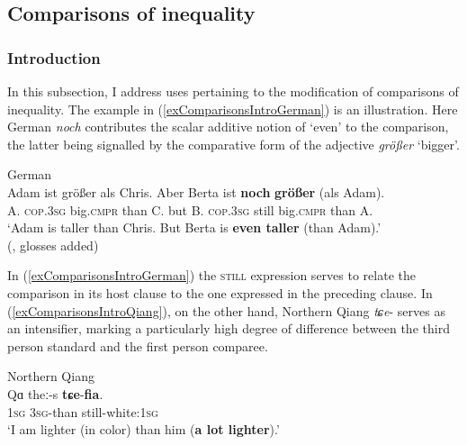 {\subsection{Comparisons of inequality}\label{sectionComparisons} 
\subsubsection{Introduction} In this subsection, I address uses pertaining to the modification of comparisons of inequality. The example in (\ref{exComparisonsIntroGerman}) is an illustration. Here German \textit{noch} contributes the scalar additive notion of \lq even\rq{ }to the comparison, the latter being signalled by the comparative form of the adjective \textit{größer} \lq bigger\rq{}.

\begin{exe}
	\ex German\label{exComparisonsIntroGerman}\\
	\gll Adam ist größer als Chris. Aber Berta ist \textbf{noch} \textbf{größer} (als Adam).\\
	A. \textsc{cop}.3\textsc{sg} big.\textsc{cmpr} than C. but B. \textsc{cop}.3\textsc{sg} still big.\textsc{cmpr} \phantom{(}than A.\\
	\glt \lq Adam is taller than Chris. But Berta is \textbf{even taller} (than Adam).\rq{}
	\\(\cite[9]{Umbach2009}, glosses added)
\end{exe}

In (\ref{exComparisonsIntroGerman}) the \textsc{still} expression serves to relate the comparison in its host clause to the one expressed in the preceding clause. In (\ref{exComparisonsIntroQiang}), on the other hand, Northern Qiang \mbox{\textit{tɕe}-} serves as an intensifier, marking a particularly high degree of difference between the third person standard and the first person comparee.

\begin{exe}
	\ex Northern Qiang\label{exComparisonsIntroQiang}\\
	\gll Qɑ theː-s \textbf{tɕe}-\textbf{fia}.\\
	1\textsc{sg} 3\textsc{sg}-than still-white:1\textsc{sg}\\
	\glt \lq I am lighter (in color) than him (\textbf{a lot lighter}).'
	\\\parencite[88]{LaPollaHuang2003}
\end{exe}

}
